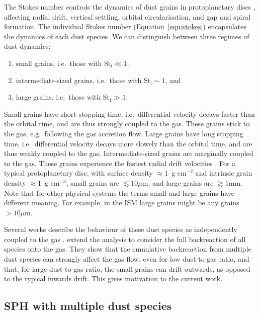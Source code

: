 \documentclass[fleqn,usenatbib]{mnras}
\begin{document}
The Stokes number controls the dynamics of dust grains in protoplanetary discs
\citep{Weidenschilling1977MNRAS.180...57W, Takeuchi2002ApJ...581.1344T},
affecting radial drift, vertical settling, orbital circularisation, and gap and
spiral formation. The individual Stokes number (Equation~\ref{eqn:stokes})
encapsulates the dynamics of each dust species. We can distinguish between three
regimes of dust dynamics:
%
\begin{enumerate}
   \item small grains, i.e.\ those with \(\mathrm{St_i} \ll 1\),
   \item intermediate-sized grains, i.e.\ those with \(\mathrm{St_i} \sim 1\),
      and
   \item large grains, i.e.\ those with \(\mathrm{St_i} \gg 1\).
\end{enumerate}
%
Small grains have short stopping time, i.e.\ differential velocity decays faster
than the orbital time, and are thus strongly coupled to the gas. These grains
stick to the gas, e.g.\ following the gas accretion flow. Large grains have long
stopping time, i.e.\ differential velocity decays more slowely than the orbital
time, and are thus weakly coupled to the gas. Intermediate-sized grains are
marginally coupled to the gas. These grains experience the fastest radial drift
velocities \citep{Takeuchi2002ApJ...581.1344T,Ayliffe2012MNRAS.423.1450A}. For a
typical protoplanetary disc, with surface density \(\approx 1\)~g cm\({}^{-2}\)
and intrinsic grain density \(\approx 1\)~g cm\({}^{-3}\), small grains are
\(\lesssim 10 \mu\mathrm{m}\), and large grains are \(\gtrsim 1 \mathrm{mm}\).
Note that for other physical systems the terms small and large grains have
different meaning. For example, in the ISM large grains might be any grains \(>
10 \mu\mathrm{m}\).

Several works describe the behaviour of these dust species as independently
coupled to the gas \citep{Nakagawa1986Icar...67..375N,
Dipierro2017MNRAS.469.1932D, Kanagawa2017ApJ...844..142K}.
\citet{Dipierro2018MNRAS.479.4187D} extend the analysis to consider the full
backreaction of all species onto the gas. They show that the cumulative
backreaction from multiple dust species can strongly affect the gas flow, even
for low dust-to-gas ratio, and that, for large dust-to-gas ratio, the small
grains can drift outwards, as opposed to the typical inwards drift. This gives
motivation to the current work.


\subsection{SPH with multiple dust species}%
\label{subsec:sph}
\end{document}
